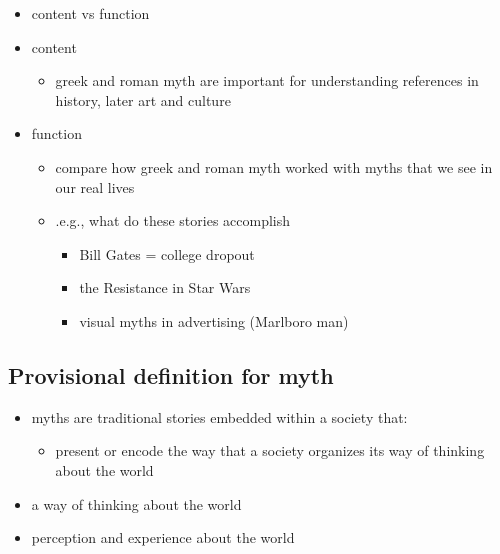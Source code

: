 \documentclass[
  12pt]{findlay}
\providecommand{\tightlist}{%
  \setlength{\itemsep}{0pt}\setlength{\parskip}{0pt}}
\begin{document}
\begin{itemize}
\item
  content vs function
\item
  content

  \begin{itemize}
  \tightlist
  \item
    greek and roman myth are important for understanding references in
    history, later art and culture
  \end{itemize}
\item
  function

  \begin{itemize}
  \tightlist
  \item
    compare how greek and roman myth worked with myths that we see in
    our real lives
  \item
    .e.g., what do these stories accomplish

    \begin{itemize}
    \tightlist
    \item
      Bill Gates = college dropout
    \item
      the Resistance in Star Wars
    \item
      visual myths in advertising (Marlboro man)
    \end{itemize}
  \end{itemize}
\end{itemize}

\hypertarget{provisional-definition-for-myth}{%
\subsection{Provisional definition for
myth}\label{provisional-definition-for-myth}}

\begin{itemize}
\tightlist
\item
  myths are traditional stories embedded within a society that:

  \begin{itemize}
  \tightlist
  \item
    present or encode the way that a society organizes its way of
    thinking about the world
  \end{itemize}
\item
  a way of thinking about the world
\item
  perception and experience about the world
\end{itemize}

\printbibliography[title=Myth and History]
\end{document}
